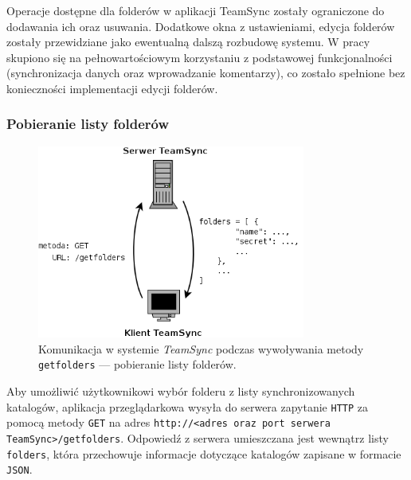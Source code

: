 Operacje dostępne dla folderów w aplikacji TeamSync zostały ograniczone do dodawania ich oraz usuwania. Dodatkowe okna z ustawieniami, edycja folderów zostały przewidziane jako ewentualną dalszą rozbudowę systemu. W pracy skupiono się na pełnowartościowym korzystaniu z podstawowej funkcjonalności (synchronizacja danych oraz wprowadzanie komentarzy), co zostało spełnione bez konieczności implementacji edycji folderów.

\subsubsection*{Pobieranie listy folderów}

\begin{figure}[h!]
  \vspace{5pt}
  \begin{center}
    \includegraphics[width=250pt]{figures/metgetfolders.png}
  \end{center}
  \caption{Komunikacja w systemie \emph{TeamSync} podczas wywoływania metody \texttt{getfolders} --- pobieranie listy folderów.}
  \label{picmetgetfolders}
\end{figure}

Aby umożliwić użytkownikowi wybór folderu z listy synchronizowanych katalogów, aplikacja przeglądarkowa wysyła do serwera zapytanie \texttt{HTTP} za pomocą metody \texttt{GET} na adres \texttt{http://<adres oraz port serwera TeamSync>\-/getfolders}. Odpowiedź z serwera umieszczana jest wewnątrz listy \texttt{folders}, która przechowuje informacje dotyczące katalogów zapisane w formacie \texttt{JSON}.


